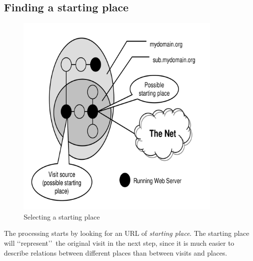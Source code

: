 \documentclass[a4paper]{danarticle}
\begin{document}
    \subsection{Finding a starting place}
       \begin{figure}[ht]
       \centering
	 \includegraphics[width=10cm]{startingplace}
	 \caption{Selecting a starting place}
	 \label{startingplace}
       \end{figure}
       The processing starts by looking for an URL of \textit{starting place}. 
       The starting
       place will \lq\lq represent\rq\rq\ the original visit in the next step,
       since it is much easier to describe relations between different
       places than between visits and places.
       
\end{document}
